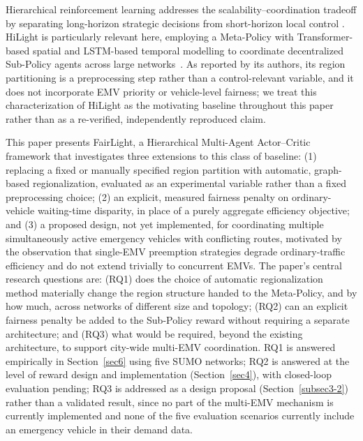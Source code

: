 \documentclass[3p,times]{elsarticle}
\theoremstyle{plain}
\theoremstyle{definition}
\begin{document}
Hierarchical reinforcement learning addresses the
scalability--coordination tradeoff by separating long-horizon
strategic decisions from short-horizon local control
\cite{feudalhrl,hirol}. HiLight is particularly relevant here,
employing a Meta-Policy with Transformer-based spatial and LSTM-based
temporal modelling to coordinate decentralized Sub-Policy agents
across large networks~\cite{hilight}. As reported by its authors, its
region partitioning is a preprocessing step rather than a
control-relevant variable, and it does not incorporate EMV priority
or vehicle-level fairness; we treat this characterization of HiLight as
the motivating baseline throughout this paper rather than as a
re-verified, independently reproduced claim.

This paper presents FairLight, a Hierarchical Multi-Agent Actor--Critic
framework that investigates three extensions to this class of
baseline: (1) replacing a fixed or manually specified region partition
with automatic, graph-based regionalization, evaluated as an
experimental variable rather than a fixed preprocessing choice; (2) an
explicit, measured fairness penalty on ordinary-vehicle waiting-time
disparity, in place of a purely aggregate efficiency objective; and (3)
a proposed design, not yet implemented, for coordinating multiple
simultaneously active emergency vehicles with conflicting routes,
motivated by the observation that single-EMV preemption strategies
degrade ordinary-traffic efficiency and do not extend trivially to
concurrent EMVs. The paper's central research questions are: (RQ1)
does the choice of automatic regionalization method materially change
the region structure handed to the Meta-Policy, and by how much, across
networks of different size and topology; (RQ2) can an explicit
fairness penalty be added to the Sub-Policy reward without requiring a
separate architecture; and (RQ3) what would be required, beyond the
existing architecture, to support city-wide multi-EMV coordination.
RQ1 is answered empirically in Section~\ref{sec6} using five SUMO
networks; RQ2 is answered at the level of reward design and
implementation (Section~\ref{sec4}), with closed-loop evaluation
pending; RQ3 is addressed as a design proposal (Section~\ref{subsec3-2})
rather than a validated result, since no part of the multi-EMV
mechanism is currently implemented and none of the five evaluation
scenarios currently include an emergency vehicle in their demand data.
\end{document}
